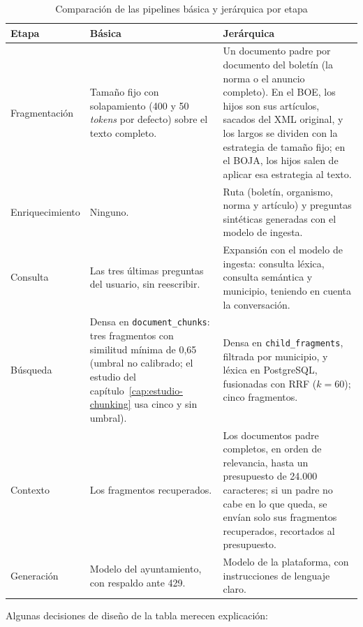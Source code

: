 \begin{table}[htbp]
  \centering
  \small
  \caption{Comparación de las pipelines básica y jerárquica por etapa}
  \label{tab:pipelines}
  \begin{tabularx}{\textwidth}{@{}l X X@{}}
    \toprule
    \textbf{Etapa} & \textbf{Básica} & \textbf{Jerárquica} \\
    \midrule
    Fragmentación & Tamaño fijo con solapamiento (400 y 50 \emph{tokens} por defecto) sobre el texto completo. & Un documento padre por documento del boletín (la norma o el anuncio completo). En el BOE, los hijos son sus artículos, sacados del XML original, y los largos se dividen con la estrategia de tamaño fijo; en el BOJA, los hijos salen de aplicar esa estrategia al texto. \\
    Enriquecimiento & Ninguno. & Ruta (boletín, organismo, norma y artículo) y preguntas sintéticas generadas con el modelo de ingesta. \\
    Consulta & Las tres últimas preguntas del usuario, sin reescribir. & Expansión con el modelo de ingesta: consulta léxica, consulta semántica y municipio, teniendo en cuenta la conversación. \\
    Búsqueda & Densa en \texttt{document\_chunks}: tres fragmentos con similitud mínima de 0,65 (umbral no calibrado; el estudio del capítulo~\ref{cap:estudio-chunking} usa cinco y sin umbral). & Densa en \texttt{child\_fragments}, filtrada por municipio, y léxica en PostgreSQL, fusionadas con RRF ($k=60$); cinco fragmentos. \\
    Contexto & Los fragmentos recuperados. & Los documentos padre completos, en orden de relevancia, hasta un presupuesto de 24.000 caracteres; si un padre no cabe en lo que queda, se envían solo sus fragmentos recuperados, recortados al presupuesto. \\
    Generación & Modelo del ayuntamiento, con respaldo ante 429. & Modelo de la plataforma, con instrucciones de lenguaje claro. \\
    \bottomrule
  \end{tabularx}
\end{table}

Algunas decisiones de diseño de la tabla merecen explicación:

